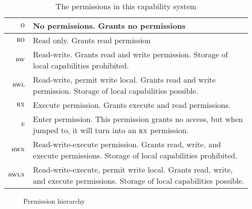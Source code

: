 \documentclass[a4paper]{article}
\newcommand{\plainperm}[1]{\textsc{#1}}
\newcommand{\noperm}{\plainperm{o}}
\newcommand{\readonly}{\plainperm{ro}}
\newcommand{\readwrite}{\plainperm{rw}}
\newcommand{\exec}{\plainperm{rx}}
\newcommand{\entry}{\plainperm{e}}
\newcommand{\rwx}{\plainperm{rwx}}
\newcommand{\readwritel}{\plainperm{rwl}}
\newcommand{\rwlx}{\plainperm{rwlx}}
\begin{document}
\begin{table}[!h]
  \centering
  \begin{tabular}[!h]{r |  p{7cm} }
    $\noperm$ & No permissions. Grants no permissions\\
    \hline
    $\readonly$ & Read only. Grants read permission \\
    \hline
    $\readwrite$ & Read-write. Grants read and write permission. Storage of local capabilities prohibited. \\
    \hline
    $\readwritel$ & Read-write, permit write local. Grants read and write permission. Storage of local capabilities possible. \\
    \hline
    $\exec$ & Execute permission. Grants execute and read permissions.\\
    \hline
    $\entry$ & Enter permission. This permission grants no access, but when jumped to, it will turn into an $\exec$ permission.\\
    \hline
    $\rwx$ & Read-write-execute permission. Grants read, write, and execute permissions. Storage of local capabilities prohibited. \\
    \hline
    $\rwlx$ & Read-write-execute, permit write local. Grants read, write, and execute permissions. Storage of local capabilities possible.
  \end{tabular}

  \caption{The permissions in this capability system}
  \label{tab:permission-list}
\end{table}
\begin{figure}[!h]
  \centering

  \caption{Permission hierarchy}
  \label{fig:perm-hier}
\end{figure}
\end{document}

